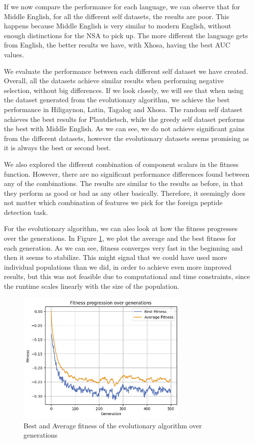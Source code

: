 \documentclass{article}
\begin{document}
If we now compare the performance for each language, we can observe that for Middle English, for all the different self 
datasets, the results are poor. This happens because Middle English is very similar to modern English, without enough 
distinctions for the NSA to pick up. The more different the language gets from English, the better results we have, 
with Xhosa, having the best AUC values.

We evaluate the performance between each different self dataset we have created. Overall, all the datasets 
achieve similar results when performing negative selection, without big differences. If we look closely, we will see that when using the dataset generated from the evolutionary 
algorithm, we achieve the best performance in Hiligaynon, Latin, Tagalog and Xhosa. The random self dataset achieves the 
best results for Plautdietsch, while the greedy self dataset performs the best with Middle English. As we can see, we 
do not achieve significant gains from the different datasets, however the evolutionary datasets seems promising as it is 
always the best or second best.

We also explored the different combination of component scalars in the fitness function. 
However, there are no significant performance differences found between any of the combinations.
The results are similar to the results as before, in that they perform as good or bad as any other basically.
Therefore, it seemingly does not matter which combination of features we pick for the foreign peptide detection task.

For the evolutionary algorithm, we can also look at how the fitness progresses over the generations. In Figure 
\ref{fig:ea_fit_over_gens}, we plot the average and the best fitness for each generation. As we can see, fitness 
converges very fast in the beginning and then it seems to stabilize. This might signal that we could have used more 
individual populations than we did, in order to achieve even more improved results, but this was not feasible due to 
computational and time constraints, since the runtime scales linearly with the size of the population. 

\begin{figure}[ht]
    \includegraphics[width=0.75\textwidth]{images/fitness_over_gens.jpeg}
    \caption{Best and Average fitness of the evolutionary algorithm over generations}
    \label{fig:ea_fit_over_gens}
\end{figure}
\end{document}
